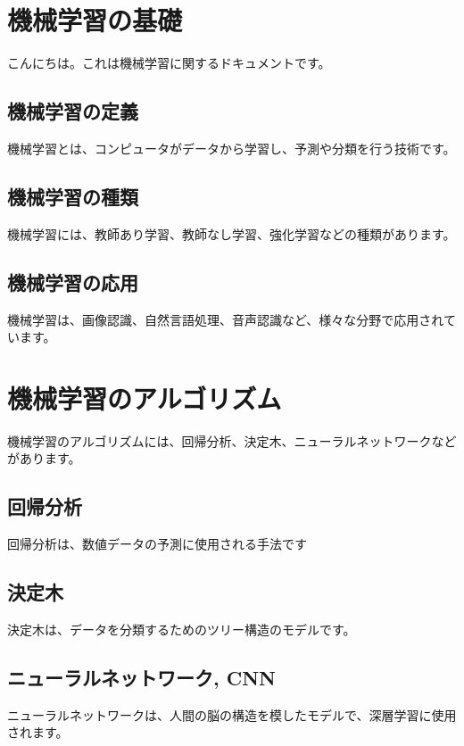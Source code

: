 \documentclass{ltjsarticle}      %
\begin{document}
\section{機械学習の基礎}
 こんにちは。これは機械学習に関するドキュメントです。
\subsection{機械学習の定義}
 機械学習とは、コンピュータがデータから学習し、予測や分類を行う技術です。
\subsection{機械学習の種類}
 機械学習には、教師あり学習、教師なし学習、強化学習などの種類があります。
\subsection{機械学習の応用}
 機械学習は、画像認識、自然言語処理、音声認識など、様々な分野で応用されています。
\section{機械学習のアルゴリズム}
 機械学習のアルゴリズムには、回帰分析、決定木、ニューラルネットワークなどがあります。
\subsection{回帰分析}
 回帰分析は、数値データの予測に使用される手法です
\subsection{決定木}
 決定木は、データを分類するためのツリー構造のモデルです。
\subsection{ニューラルネットワーク, CNN}
 ニューラルネットワークは、人間の脳の構造を模したモデルで、深層学習に使用されます。
\end{document}
